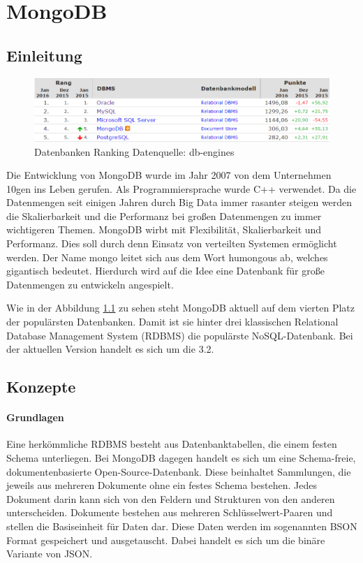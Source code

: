 \chapter{MongoDB}\label{mongodb-fabian}

\section{Einleitung}\label{einleitung}

\begin{figure}[h]
	\centering
	\includegraphics[width=0.7\linewidth]{figures/db-ranking.png}
	\caption{Datenbanken Ranking Datenquelle: db-engines \cite{db-engines:mongodb}}
	\label{f:mongodb:ranking}
\end{figure}

Die Entwicklung von MongoDB wurde im Jahr 2007 von dem Unternehmen 10gen
ins Leben gerufen. Als Programmiersprache wurde C++ verwendet.
Da die Datenmengen seit einigen Jahren durch Big Data immer rasanter steigen \cite{csc:bigdata}
werden die Skalierbarkeit und die Performanz bei großen Datenmengen zu
immer wichtigeren Themen. MongoDB wirbt mit Flexibilität, Skalierbarkeit und
Performanz. Dies soll durch denn Einsatz von verteilten Systemen
ermöglicht werden. Der Name mongo leitet sich aus dem Wort humongous ab,
welches gigantisch bedeutet. Hierdurch wird auf die Idee eine Datenbank
für große Datenmengen zu entwickeln angespielt.

Wie in der Abbildung \ref{f:mongodb:ranking} zu sehen steht MongoDB aktuell auf dem
vierten Platz der populärsten Datenbanken. Damit ist sie hinter drei
klassischen Relational Database Management System (RDBMS) die populärste
NoSQL-Datenbank. Bei der aktuellen Version handelt es sich um die 3.2.

\section{Konzepte}\label{konzepte}

\subsubsection{Grundlagen}
Eine herkömmliche RDBMS besteht aus Datenbanktabellen, die einem festen
Schema unterliegen. Bei MongoDB dagegen handelt es sich um eine
Schema-freie, dokumentenbasierte Open-Source-Datenbank. Diese beinhaltet
Sammlungen, die jeweils aus mehreren Dokumente ohne ein festes Schema
bestehen. Jedes Dokument darin kann sich von den Feldern und Strukturen
von den anderen unterscheiden. Dokumente bestehen aus mehreren
Schlüsselwert-Paaren und stellen die Basiseinheit für Daten dar.
Diese Daten werden im sogenannten BSON Format gespeichert und
ausgetauscht. Dabei handelt es sich um die binäre Variante von JSON.

